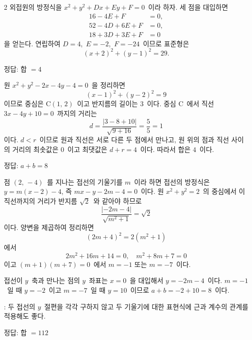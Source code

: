 \documentclass[10pt,fleqn]{article}
\begin{document}
\begin{multicols*}{2}
외접원의 방정식을 $x^2 + y^2 + Dx + Ey + F = 0$\ 이라 하자. 세 점을 대입하면
\begin{align*}
  16 - 4E + F &= 0,\\
  52 - 4D + 6E + F &= 0,\\
  18 + 3D + 3E + F &= 0
\end{align*}
을 얻는다. 연립하여 $D = 4$,\ $E = -2$,\ $F = -24$\ 이므로 표준형은
\[ (x+2)^2 + (y-1)^2 = 29. \]
\begin{dmanswerbox}
정답: 합 $=4$
\end{dmanswerbox}

원 $x^2 + y^2 - 2x - 4y - 4 = 0$\ 을 정리하면
\[ (x-1)^2 + (y-2)^2 = 9 \]
이므로 중심은 $\mathrm{C}(1,\, 2)$\ 이고 반지름의 길이는 $3$\ 이다. 중심 $\mathrm{C}$\ 에서 직선 $3x - 4y + 10 = 0$\ 까지의 거리는
\[ d = \dfrac{|3 - 8 + 10|}{\sqrt{9 + 16}} = \dfrac{5}{5} = 1 \]
이다. $d < r$\ 이므로 원과 직선은 서로 다른 두 점에서 만나고, 원 위의 점과 직선 사이의 거리의 최솟값은 $0$\ 이고 최댓값은 $d + r = 4$\ 이다. 따라서 합은 $4$\ 이다.

\begin{dmanswerbox}
정답: $a+b=8$
\end{dmanswerbox}

점 $(2,\, -4)$\ 를 지나는 접선의 기울기를 $m$\ 이라 하면 접선의 방정식은 $y = m(x - 2) - 4$, 즉 $mx - y - 2m - 4 = 0$\ 이다. 원 $x^2 + y^2 = 2$\ 의 중심에서 이 직선까지의 거리가 반지름 $\sqrt{2}$\ 와 같아야 하므로
\[ \dfrac{|{-2m - 4}|}{\sqrt{m^2 + 1}} = \sqrt{2} \]
이다. 양변을 제곱하여 정리하면
\[ (2m + 4)^2 = 2(m^2 + 1) \]
에서
\[ 2m^2 + 16m + 14 = 0,\quad m^2 + 8m + 7 = 0 \]
이고 $(m+1)(m+7) = 0$\ 에서 $m = -1$ 또는 $m = -7$\ 이다.

접선이 $y$\ 축과 만나는 점의 $y$\ 좌표는 $x = 0$\ 을 대입해서 $y = -2m - 4$\ 이다. $m = -1$\ 일 때 $y = -2$\ 이고 $m = -7$\ 일 때 $y = 10$\ 이므로 $a + b = -2 + 10 = 8$\ 이다.

\begin{dmcriticalpoint}
: 두 접선의 $y$\ 절편을 각각 구하지 않고 두 기울기에 대한 표현식에 근과 계수의 관계를 적용해도 좋다.
\end{dmcriticalpoint}

\begin{dmanswerbox}
정답: 합 $=112$
\end{dmanswerbox}


\end{multicols*}
\end{document}
